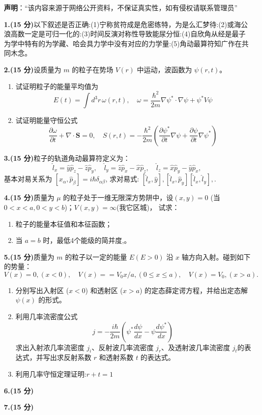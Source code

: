 
\textbf{声明}：“该内容来源于网络公开资料，不保证真实性，如有侵权请联系管理员”

\textbf{1.(15 分)}以下叙述是否正确:(1)宁称贫符成是危密练特，为是么汇梦待:(2)或海公浪高数一定是可归一化的:(3)时间反演对称性导致能尿分恒:(4)自欣角从经是最子为学中特有的为学藏、哈会具力学中没有对应的力学量:(5)角动最算符知广作在共同木念。

\textbf{2.(15 分)}设质量为 $m$ 的粒子在势场 $V(r)$ 中运动，波函数为 $\psi(r,t)$。

\begin{enumerate}
    \item  试证明粒子的能量平均值为
    \[
    E(t) = \int d^3r \, \omega(r,t), \quad \omega = \frac{\hbar^2}{2m} \nabla \psi^* \cdot \nabla \psi + \psi^* V \psi~
    \]
    
    \item  试证明能量守恒公式
    \[
    \frac{\partial \omega}{\partial t} + \nabla \cdot \mathbf{S} = 0, \quad S(r,t) = -\frac{\hbar^2}{2m} \left(\frac{\partial \psi^*}{\partial t} \nabla \psi + \frac{\partial \psi}{\partial t} \nabla \psi^*\right)~
    \]
\end{enumerate}
\textbf{3.(15 分)}粒子的轨道角动最算符定义为：
\[
\hat{l}_x = \hat{y} \hat{p}_z - \hat{z} \hat{p}_y, \quad \hat{l}_y = \hat{z} \hat{p}_x - \hat{x} \hat{p}_z, \quad \hat{l}_z = \hat{x} \hat{p}_y - \hat{y} \hat{p}_x,~
\]
基本对易关系为
$[\hat{x}_\alpha, \hat{p}_\beta] = i\hbar \delta_{\alpha\beta}$, 求对易式: $[\hat{l}_x, \hat{y}] ,  [\hat{l}_x, \hat{p}_y] [\hat{l}_x, \hat{l}_y] , .$

\textbf{4.(15 分)}质量为 $\mu$ 的粒子处于一维无限深方势阱中，设$(x,y)=0$ (当 $0 < x < a, 0 < y < b$)；$V(x, y) =\infty$(我它区城)，
试求：
\begin{enumerate}
    \item  粒子的能量本征值和本征函数；
    \item  当 $a = b$ 时，最低4个能级的简并度,。
\end{enumerate}

\textbf{5.(15 分)}质量为 $m$ 的粒子以一定的能量 $E (E > 0)$ 沿 $x$ 轴方向入射。碰到如下的势量：
\[
V(x) = 0, (x < 0), \quad V(x) = =V_0 x/a, (0 \leq x \leq a), \quad V(x) = V_0, (x > a).~
\]

\begin{enumerate}
    \item  分别写出入射区 ($x < 0$) 和透射区 ($x > a$) 的定态薛定谔方程，并给出定态解 $\psi(x)$ 的形式。
    
    \item  利用几率流密度公式
    \[
    j = -\frac{i\hbar}{2m} \left(\psi^* \frac{d\psi}{dx} - \psi \frac{d\psi^*}{dx} \right)~
    \]
    求出入射浓几率流密度 $j_i$、反射波几率流密度 $j_r$、及透射波几率流密度 $j_t$的表达式，并写出求反射系数 $r$ 和透射系数 $t$ 的表达式。
    \item  利用几率守恒定理证明:$r+t=1$
\end{enumerate}

\textbf{6.(15 分)}

\textbf{7.(15 分)}